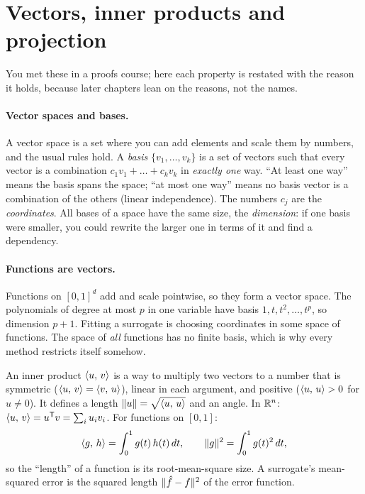 \section{Vectors, inner products and projection}
\label{sec:vectors}

You met these in a proofs course; here each property is restated with the reason it holds, because later chapters
lean on the reasons, not the names.

\paragraph{Vector spaces and bases.} A vector space is a set where you can add elements and scale them by numbers,
and the usual rules hold. A \emph{basis} $\{v_1,\dots,v_k\}$ is a set of vectors such that every vector is a
combination $c_1 v_1 + \dots + c_k v_k$ in \emph{exactly one} way. ``At least one way'' means the basis spans the
space; ``at most one way'' means no basis vector is a combination of the others (linear independence). The numbers
$c_j$ are the \emph{coordinates}. All bases of a space have the same size, the \emph{dimension}: if one basis were
smaller, you could rewrite the larger one in terms of it and find a dependency.

\paragraph{Functions are vectors.} Functions on $[0,1]^d$ add and scale pointwise, so they form a vector space. The
polynomials of degree at most $p$ in one variable have basis $1, t, t^2, \dots, t^p$, so dimension $p+1$. Fitting a
surrogate is choosing coordinates in some space of functions. The space of \emph{all} functions has no finite basis,
which is why every method restricts itself somehow.

\begin{definition}
An inner product $\langle u,\, v\rangle$ is a way to multiply two vectors to a number that is symmetric
($\langle u,\, v\rangle = \langle v,\, u\rangle$), linear in each argument, and positive ($\langle u,\, u\rangle > 0$ for $u \neq 0$). It defines a
length $\lVert u\rVert = \sqrt{\langle u,\, u\rangle}$ and an angle. In $\mathbb{R}^n$: $\langle u,\, v\rangle = u^{\mathsf{T}} v = \sum_i u_i v_i$. For functions on
$[0,1]$:
\begin{equation}
  \langle g,\, h\rangle = \int_0^1 g(t)\, h(t)\, dt, \qquad \lVert g\rVert^2 = \int_0^1 g(t)^2\, dt ,
\end{equation}
so the ``length'' of a function is its root-mean-square size. A surrogate's mean-squared error is the squared
length $\lVert \hat f - f\rVert^2$ of the error function.
\end{definition}

